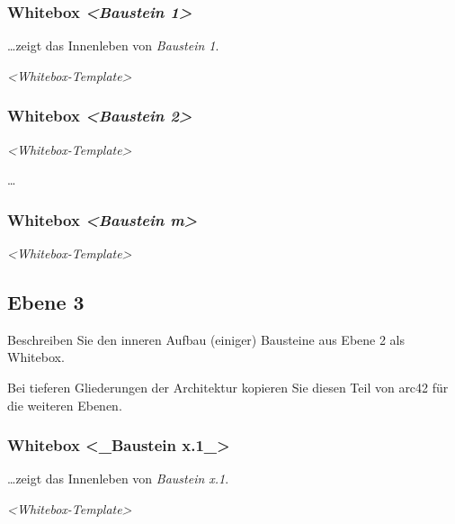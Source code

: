 \documentclass[
]{article}
\begin{document}
\subsubsection{\texorpdfstring{Whitebox \emph{\textless Baustein
1\textgreater{}}}{Whitebox \textless Baustein 1\textgreater{}}}\label{_whitebox_baustein_1}

\ldots\hspace{0pt}zeigt das Innenleben von \emph{Baustein 1}.

\emph{\textless Whitebox-Template\textgreater{}}

\subsubsection{\texorpdfstring{Whitebox \emph{\textless Baustein
2\textgreater{}}}{Whitebox \textless Baustein 2\textgreater{}}}\label{_whitebox_baustein_2}

\emph{\textless Whitebox-Template\textgreater{}}

\ldots\hspace{0pt}

\subsubsection{\texorpdfstring{Whitebox \emph{\textless Baustein
m\textgreater{}}}{Whitebox \textless Baustein m\textgreater{}}}\label{_whitebox_baustein_m}

\emph{\textless Whitebox-Template\textgreater{}}

\subsection{Ebene 3}\label{_ebene_3}

Beschreiben Sie den inneren Aufbau (einiger) Bausteine aus Ebene 2 als
Whitebox.

Bei tieferen Gliederungen der Architektur kopieren Sie diesen Teil von
arc42 für die weiteren Ebenen.

\subsubsection{Whitebox \textless\_Baustein
x.1\_\textgreater{}}\label{_whitebox_baustein_x_1}

\ldots\hspace{0pt}zeigt das Innenleben von \emph{Baustein x.1}.

\emph{\textless Whitebox-Template\textgreater{}}
\end{document}
